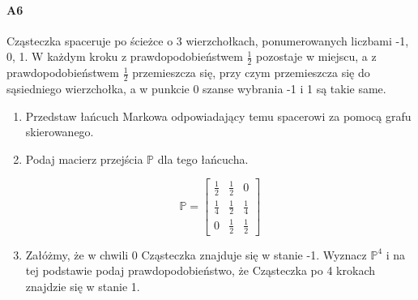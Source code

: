 \paragraph{A6} Cząsteczka spaceruje po ścieżce o 3 wierzchołkach, ponumerowanych liczbami -1, 0, 1. W każdym kroku z prawdopodobieństwem $\frac{1}{2}$ pozostaje w miejscu, a z prawdopodobieństwem $\frac{1}{2}$ przemieszcza się, przy czym przemieszcza się do sąsiedniego wierzchołka, a w punkcie 0 szanse wybrania -1 i 1 są takie same.
\begin{enumerate}[label=\alph*)]
\item Przedstaw łańcuch Markowa odpowiadający temu spacerowi za pomocą grafu skierowanego.

\begin{figure}[H]
\centering
{}
\end{figure}
\item Podaj macierz przejścia $\mathbb{P}$ dla tego łańcucha.

$$\mathbb{P}=\begin{bmatrix}
\frac{1}{2}&\frac{1}{2}&0\\
\frac{1}{4}&\frac{1}{2}&\frac{1}{4}\\
0&\frac{1}{2}&\frac{1}{2}
\end{bmatrix}$$
\item Załóżmy, że w chwili 0 Cząsteczka znajduje się w stanie -1. Wyznacz $\mathbb{P}^4$ i na tej podstawie podaj prawdopodobieństwo, że Cząsteczka po 4 krokach znajdzie się w stanie 1.


\end{enumerate}
